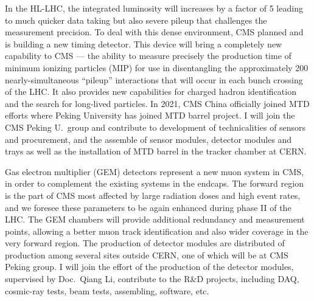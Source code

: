 \documentclass[twoside,11pt]{report}
\begin{document}
In the HL-LHC, the integrated luminosity will increases by a factor of 5 leading to much quicker data taking 
but also severe pileup that challenges the measurement precision.
To deal with this dense environment, CMS planned and is building a new timing detector.
This device will bring a completely new capability to CMS — the ability to measure precisely the production 
time of minimum ionizing particles (MIP) for use in disentangling the approximately 200
nearly-simultaneous ``pileup'' interactions that will occur in each bunch crossing of the LHC. It
also provides new capabilities for charged hadron identification and the search for long-lived
particles.
In 2021, CMS China officially joined MTD efforts where Peking University has joined MTD barrel project.
I will join the CMS Peking U.\ group and contribute to development of technicalities of sensors and procurement, and 
the assemble of sensor modules, detector modules and trays as well as the installation of MTD barrel
in the tracker chamber at CERN.

Gas electron multiplier (GEM) detectors represent a new muon system in CMS, 
in order to complement the existing systems in the endcaps. 
The forward region is the part of CMS most affected by large radiation doses and high event rates, 
and we foresee these parameters to be again enhanced during phase II of the LHC. 
The GEM chambers will provide additional redundancy and measurement points, 
allowing a better muon track identification and also wider coverage in the very forward region.
The production of detector modules are distributed of production among several sites outside CERN, 
one of which will be at CMS Peking group. 
I will join the effort of the production of the detector modules, supervised by Doc.\ Qiang Li,
contribute to the R\&D projects, including DAQ, cosmic-ray tests, beam tests, assembling, software, etc.
\end{document}
